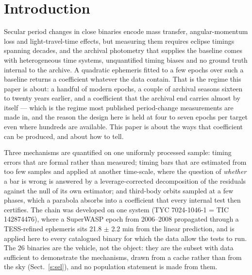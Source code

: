 \documentclass{aa}
\begin{document}
\section{Introduction}\label{s:intro}
Secular period changes in close binaries encode mass transfer, angular-momentum loss and light-travel-time effects, but measuring them requires eclipse timings spanning decades, and the archival photometry that supplies the baseline comes with heterogeneous time systems, unquantified timing biases and no ground truth internal to the archive. A quadratic ephemeris fitted to a few epochs over such a baseline returns a coefficient whatever the data contain. That is the regime this paper is about: a handful of modern epochs, a couple of archival seasons sixteen to twenty years earlier, and a coefficient that the archival end carries almost by itself --- which is the regime most published period-change measurements are made in, and the reason the design here is held at four to seven epochs per target even where hundreds are available. This paper is about the ways that coefficient can be produced, and about how to tell.

Three mechanisms are quantified on one uniformly processed sample: timing errors that are formal rather than measured; timing bars that are estimated from too few samples and applied at another time-scale, where the question of \textit{whether} a bar is wrong is answered by a leverage-corrected decomposition of the residuals against the null of its own estimator; and third-body orbits sampled at a few phases, which a parabola absorbs into a coefficient that every internal test then certifies. The chain was developed on one system (TYC 7024-1046-1 = TIC 142874476), where a SuperWASP epoch from 2006--2008 propagated through a TESS-refined ephemeris sits 21.8 $\pm$ 2.2 min from the linear prediction, and is applied here to every catalogued binary for which the data allow the tests to run. The 26 binaries are the vehicle, not the object: they are the subset with data sufficient to demonstrate the mechanisms, drawn from a cache rather than from the sky (Sect.~\ref{s:sel}), and no population statement is made from them.
\end{document}
